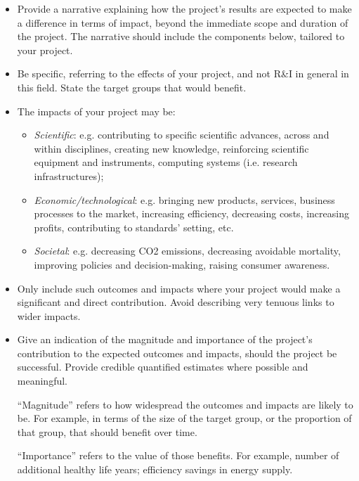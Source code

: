 \documentclass[11pt,draftproposal]{msca-pf}
\begin{document}
\begin{itemize}
    \item Provide a narrative explaining how the project’s results are expected
    to make a difference in terms of impact, beyond the immediate scope and
    duration of the project. The narrative should include the components below,
    tailored to your project.

    \item Be specific, referring to the effects of your project, and not R\&I
    in general in this field. State the target groups that would benefit.

    \item The impacts of your project may be:

    \begin{itemize}
        \item \emph{Scientific}: e.g. contributing to specific scientific advances,
        across and within disciplines, creating new knowledge, reinforcing
        scientific equipment and instruments, computing systems (i.e. research
        infrastructures);

        \item \emph{Economic/technological}: e.g. bringing new
        products, services, business processes to the market, increasing efficiency,
        decreasing costs, increasing profits, contributing to standards’ setting,
        etc.

        \item \emph{Societal}: e.g. decreasing CO2 emissions,
        decreasing avoidable mortality, improving policies and decision-making,
        raising consumer awareness.
    \end{itemize}

    \item Only include such outcomes and impacts where your project would make
    a significant and direct contribution. Avoid describing very tenuous links
    to wider impacts.

    \item Give an indication of the magnitude and importance of the project's
    contribution to the expected outcomes and impacts, should the project be
    successful. Provide credible quantified estimates where possible and meaningful.

    ``Magnitude'' refers to how widespread the outcomes and impacts are likely
    to be. For example, in terms of the size of the target group, or the
    proportion of that group, that should benefit over time.

    ``Importance'' refers to the value of those benefits. For example, number of
    additional healthy life years; efficiency savings in energy supply.
\end{itemize}
\end{document}
